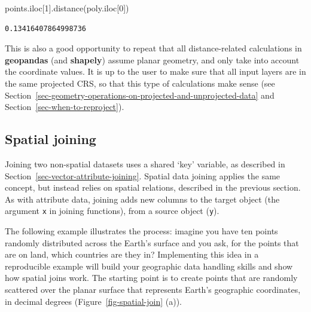 \documentclass[
  letterpaper,
]{krantz}
\newenvironment{Shaded}{\begin{snugshade}}{\end{snugshade}}
\newcommand{\DecValTok}[1]{\textcolor[rgb]{0.68,0.00,0.00}{#1}}
\newcommand{\NormalTok}[1]{\textcolor[rgb]{0.00,0.23,0.31}{#1}}
\begin{document}
\begin{Shaded}
\begin{Highlighting}[]
\NormalTok{points.iloc[}\DecValTok{1}\NormalTok{].distance(poly.iloc[}\DecValTok{0}\NormalTok{])}
\end{Highlighting}
\end{Shaded}

\begin{verbatim}
0.13416407864998736
\end{verbatim}

This is also a good opportunity to repeat that all distance-related
calculations in \textbf{geopandas} (and \textbf{shapely}) assume planar
geometry, and only take into account the coordinate values. It is up to
the user to make sure that all input layers are in the same projected
CRS, so that this type of calculations make sense (see
Section~\ref{sec-geometry-operations-on-projected-and-unprojected-data}
and Section~\ref{sec-when-to-reproject}).

\subsection{Spatial joining}\label{sec-spatial-joining}

Joining two non-spatial datasets uses a shared `key' variable, as
described in Section~\ref{sec-vector-attribute-joining}. Spatial data
joining applies the same concept, but instead relies on spatial
relations, described in the previous section. As with attribute data,
joining adds new columns to the target object (the argument \texttt{x}
in joining functions), from a source object (\texttt{y}).

The following example illustrates the process: imagine you have ten
points randomly distributed across the Earth's surface and you ask, for
the points that are on land, which countries are they in? Implementing
this idea in a reproducible example will build your geographic data
handling skills and show how spatial joins work. The starting point is
to create points that are randomly scattered over the planar surface
that represents Earth's geographic coordinates, in decimal degrees
(Figure~\ref{fig-spatial-join} (a)).
\end{document}
